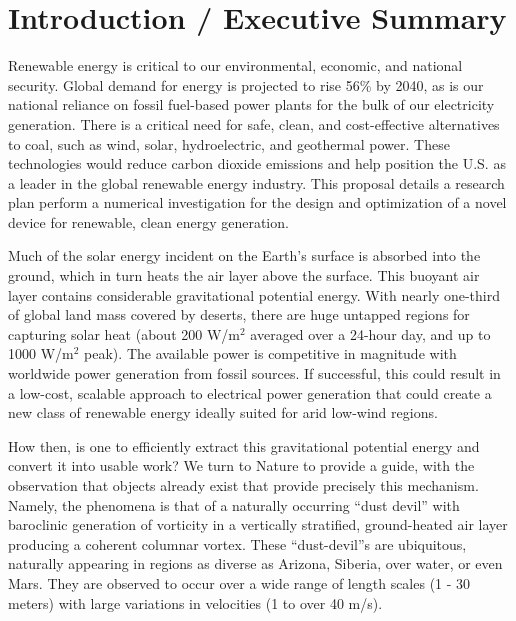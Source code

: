 \section{Introduction / Executive Summary}

Renewable energy is critical to our environmental, economic, and
national security. Global demand for energy is projected to rise 56\% by
2040\cite{energy-outlook}, as is our national reliance on fossil
fuel-based power plants for the bulk of our electricity generation. 
There is a critical need for safe, clean, and
cost-effective alternatives to coal, such as wind, solar, hydroelectric,
and geothermal power. These technologies would reduce carbon dioxide
emissions and help position the U.S. as a leader in the global renewable
energy industry. 
%
This proposal details a research plan perform a numerical investigation
for the design and optimization of a novel device for renewable, clean
energy generation. 

Much of the solar energy incident on the Earth's surface is absorbed
into the ground, which in turn heats the air layer above the surface.
This buoyant air layer contains considerable gravitational potential
energy. 
With nearly one-third of global land mass covered by deserts, there are huge
untapped regions for capturing solar heat (about 200 W/$\text{m}^2$ averaged over
a 24-hour day, and up to 1000 W/$\text{m}^2$ peak)\cite{something}.  The
available power is competitive in magnitude with worldwide power
generation from fossil sources. If successful, this could result in a
low-cost, scalable approach to electrical power generation that could
create a new class of renewable energy ideally suited for arid low-wind regions. 

How then, is one to efficiently extract this gravitational potential
energy and convert it into usable work? We turn to Nature to provide a 
guide, with the observation that objects already
exist that provide precisely this mechanism. Namely, the phenomena is
that of a naturally 
%
%
occurring ``dust devil'' with baroclinic generation of vorticity in a
vertically stratified, ground-heated air layer producing a coherent
columnar vortex. These ``dust-devil''s are ubiquitous, naturally appearing in
regions as diverse as Arizona, Siberia, over water, or even
Mars\cite{Sinclair1969,ROG:ROG1635,JGRE:JGRE1660}.  
They are observed to occur over a wide range of length scales (1 - 30
meters) with large variations in velocities (1 to over 40
m/s)\cite{Sinclair1969}. 

